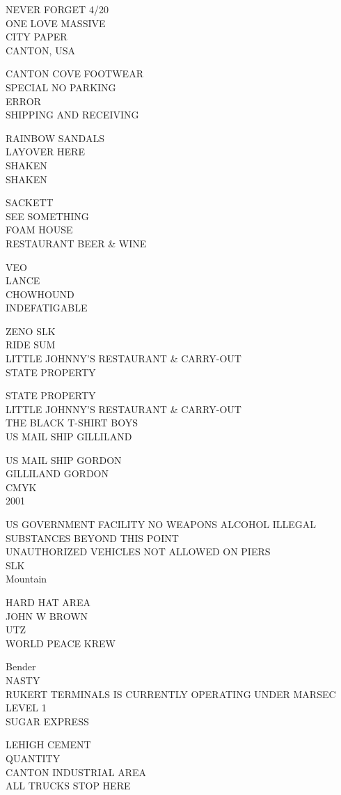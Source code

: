 \documentclass[10pt,letterpaper]{article}
\begin{document}
NEVER FORGET 4/20\\
ONE LOVE MASSIVE\\
CITY PAPER\\
CANTON, USA

CANTON COVE FOOTWEAR\\
SPECIAL NO PARKING\\
ERROR\\
SHIPPING AND RECEIVING

RAINBOW SANDALS\\
LAYOVER HERE\\
SHAKEN\\
SHAKEN

SACKETT\\
SEE SOMETHING\\
FOAM HOUSE\\
RESTAURANT BEER \& WINE

VEO\\
LANCE\\
CHOWHOUND\\
INDEFATIGABLE

ZENO SLK\\
RIDE SUM\\
LITTLE JOHNNY'S RESTAURANT \& CARRY{-}OUT\\
STATE PROPERTY

STATE PROPERTY\\
LITTLE JOHNNY'S RESTAURANT \& CARRY{-}OUT\\
THE BLACK T{-}SHIRT BOYS\\
US MAIL SHIP GILLILAND

US MAIL SHIP GORDON\\
GILLILAND GORDON\\
CMYK\\
2001

US GOVERNMENT FACILITY NO WEAPONS ALCOHOL ILLEGAL SUBSTANCES BEYOND THIS POINT\\
UNAUTHORIZED VEHICLES NOT ALLOWED ON PIERS\\
SLK\\
Mountain

HARD HAT AREA\\
JOHN W BROWN\\
UTZ\\
WORLD PEACE KREW

Bender\\
NASTY\\
RUKERT TERMINALS IS CURRENTLY OPERATING UNDER MARSEC LEVEL 1\\
SUGAR EXPRESS

LEHIGH CEMENT\\
QUANTITY\\
CANTON INDUSTRIAL AREA\\
ALL TRUCKS STOP HERE
\end{document}
